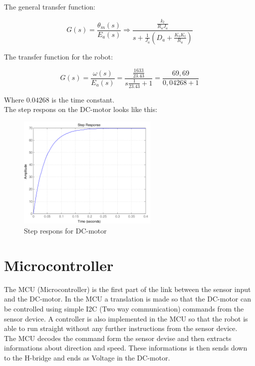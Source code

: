 The general transfer function:

\begin{equation}
G(s)=\frac{\theta_m(s)}{E_a(s)} \Rightarrow \frac{\frac{k_t}{R_a J_a}}{s+\frac{1}{J_a}(D_a + \frac{K_bK_t}{R_a})}
\end{equation}
  
 The transfer function for the robot: 

\begin{equation}
G(s)=\frac{\omega(s)}{E_a(s)}=\frac{\frac{1633}{23.43}}{s\frac{1}{23.43} +1} = \frac{69,69}{0,04268+1}
\end{equation}  

Where $0.04268$ is the time constant. \\
The step respons on the DC-motor looks like this:

\begin{figure}[!h]
	\centering
	\includegraphics[width=0.6\textwidth]{resources/motor_transfer_function.png}
	\caption{Step respons for DC-motor}
	\label{fig:2}
\end{figure}


\section{Microcontroller} 
The MCU (Microcontroller) is the first part of the link between the sensor input and the DC-motor. In the MCU a translation is made so that the DC-motor can be controlled using simple I2C (Two way communication) commands from the sensor device. A controller is also implemented in the MCU so that the robot is able to run straight without any further instructions from the sensor device.\\

The MCU decodes the command form the sensor devise and then extracts informations about direction and speed. These informations is then sends down to the H-bridge and ends as Voltage in the DC-motor.

